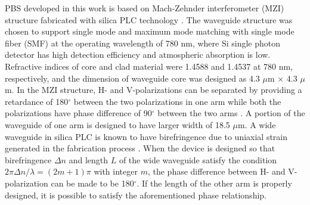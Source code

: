 \documentclass[letterpaper, 10pt]{article}
\begin{document}
PBS developed in this work is based on Mach-Zehnder interferometer (MZI) structure fabricated with silica PLC technology \cite{Kim:2012ej, Hashizume:2015ta}.
The waveguide structure was chosen to support single mode and maximum mode matching with single mode fiber (SMF) at the operating wavelength of 780 nm, where Si single photon detector has high detection efficiency and atmospheric absorption is low.
Refractive indices of core and clad material were 1.4588 and 1.4537 at 780 nm, respectively, and the dimension of waveguide core was designed as 4.3 $\mu$m $\times$ 4.3 $\mu$m.
In the MZI structure, H- and V-polarizations can be separated by providing a retardance of 180$^\circ$  between the two polarizations in one arm while both the polarizations have phase difference of 90$^\circ$  between the two arms \cite{Kim:2012ej}.
A portion of the waveguide of one arm is designed to have larger width of 18.5 $\mu$m.
A wide waveguide in silica PLC is known to have birefringence  due to uniaxial strain generated in the fabrication process \cite{Okuno:1994fm}.
When the device is designed so that birefringence $\Delta n$ and length $L$ of the wide waveguide satisfy the condition $2\pi\Delta n/\lambda  = (2m+1) \pi$ with integer $m$, the phase difference between H- and V-polarization can be made to be 180$^\circ$.
If the length of the other arm is properly designed, it is possible to satisfy the aforementioned phase relationship.
\end{document}
